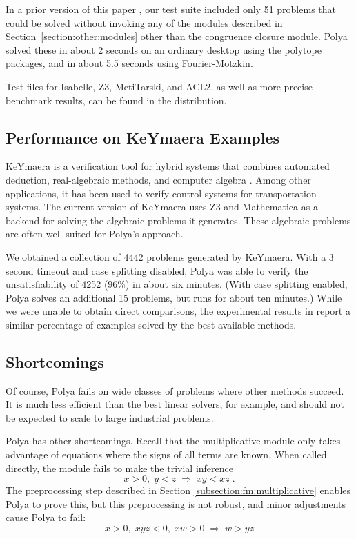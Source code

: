 \documentclass[runningheds]{llncs}
\newcommand{\myRightarrow}{\; \Rightarrow \;}
\begin{document}
In a prior version of this paper \cite{avigad:lewis:roux:14}, our test suite included only 51 problems that could be solved without invoking any of the modules described in Section~\ref{section:other:modules} other than the congruence closure module. Polya solved these in about 2 seconds on an ordinary desktop using the polytope packages, and in about 5.5 seconds using Fourier-Motzkin. 

Test files for Isabelle, Z3, MetiTarski, and ACL2, as well as more precise benchmark results, can be found in the distribution.

\subsection{Performance on KeYmaera Examples}
\label{subsection:keymaerea}

KeYmaera is a verification tool for hybrid systems that combines automated deduction, real-algebraic methods, and computer algebra \cite{platzer:08} \cite{platzer:09}. Among other applications, it has been used to verify control systems for transportation systems. The current version of KeYmaera uses Z3 and Mathematica as a backend for solving the algebraic problems it generates. These algebraic problems are often well-suited for Polya's approach. 

We obtained a collection of 4442 problems generated by KeYmaera. With a 3 second timeout and case splitting disabled, Polya was able to verify the unsatisfiability of 4252 (96\%) in about six minutes. (With case splitting enabled, Polya solves an additional 15 problems, but runs for about ten minutes.) While we were unable to obtain direct comparisons, the experimental results in \cite{platzer:09} report a similar percentage of examples solved by the best available methods.

\subsection{Shortcomings}
\label{subsection:shortcomings}

Of course, Polya fails on wide classes of problems where other methods succeed. It is much less efficient than the best linear solvers, for example, and should not be expected to scale to large industrial problems. 

Polya has other shortcomings. Recall that the multiplicative module only takes advantage of equations where the signs of all terms are known. When called directly, the module fails to make the trivial inference
\begin{equation}
 x > 0, \; y < z \myRightarrow x y < x z\;.
\end{equation}
The preprocessing step described in Section \ref{subsection:fm:multiplicative} enables Polya to prove this, but this preprocessing is not robust, and minor adjustments cause Polya to fail:
\begin{equation}
 x > 0, \; x y z < 0, \; x w > 0 \myRightarrow w > yz
 \label{eq:15}
\end{equation}
\end{document}
